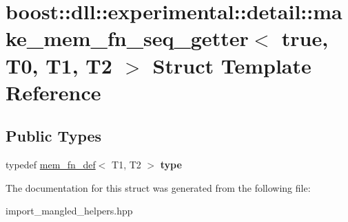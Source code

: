 \hypertarget{a00205}{}\section{boost\+:\+:dll\+:\+:experimental\+:\+:detail\+:\+:make\+\_\+mem\+\_\+fn\+\_\+seq\+\_\+getter$<$ true, T0, T1, T2 $>$ Struct Template Reference}
\label{a00205}
\subsection*{Public Types}
\begin{DoxyCompactItemize}
\item 
typedef \hyperlink{a00219}{mem\+\_\+fn\+\_\+def}$<$ T1, T2 $>$ {\bfseries type}\hypertarget{a00205_afb2258e5769451a88c219a15dd15fcea}{}\label{a00205_afb2258e5769451a88c219a15dd15fcea}

\end{DoxyCompactItemize}


The documentation for this struct was generated from the following file\+:\begin{DoxyCompactItemize}
\item 
import\+\_\+mangled\+\_\+helpers.\+hpp\end{DoxyCompactItemize}
